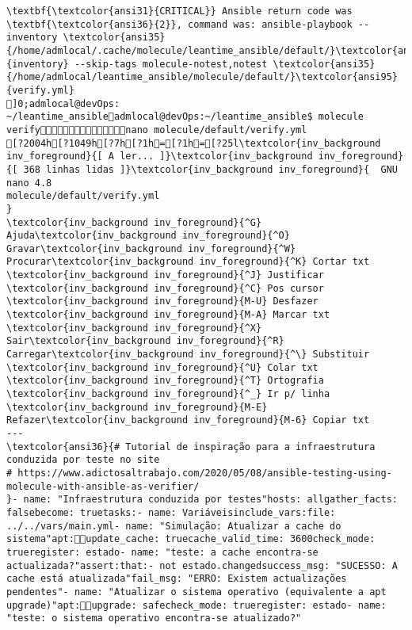 \documentclass{scrartcl}
\begin{document}
\begin{Verbatim}
\textbf{\textcolor{ansi31}{CRITICAL}} Ansible return code was \textbf{\textcolor{ansi36}{2}}, command was: ansible-playbook --inventory \textcolor{ansi35}{/home/admlocal/.cache/molecule/leantime_ansible/default/}\textcolor{ansi95}{inventory} --skip-tags molecule-notest,notest \textcolor{ansi35}{/home/admlocal/leantime_ansible/molecule/default/}\textcolor{ansi95}{verify.yml}
]0;admlocal@devOps: ~/leantime_ansibleadmlocal@devOps:~/leantime_ansible$ molecule verifynano molecule/default/verify.yml 
[?2004h[?1049h[?7h[?1h=[?1h=[?25l\textcolor{inv_background inv_foreground}{[ A ler... ]}\textcolor{inv_background inv_foreground}{[ 368 linhas lidas ]}\textcolor{inv_background inv_foreground}{  GNU nano 4.8                                          molecule/default/verify.yml                                                       }
\textcolor{inv_background inv_foreground}{^G} Ajuda\textcolor{inv_background inv_foreground}{^O} Gravar\textcolor{inv_background inv_foreground}{^W} Procurar\textcolor{inv_background inv_foreground}{^K} Cortar txt    \textcolor{inv_background inv_foreground}{^J} Justificar    \textcolor{inv_background inv_foreground}{^C} Pos cursor    \textcolor{inv_background inv_foreground}{M-U} Desfazer     \textcolor{inv_background inv_foreground}{M-A} Marcar txt
\textcolor{inv_background inv_foreground}{^X} Sair\textcolor{inv_background inv_foreground}{^R} Carregar\textcolor{inv_background inv_foreground}{^\} Substituir    \textcolor{inv_background inv_foreground}{^U} Colar txt     \textcolor{inv_background inv_foreground}{^T} Ortografia    \textcolor{inv_background inv_foreground}{^_} Ir p/ linha   \textcolor{inv_background inv_foreground}{M-E} Refazer\textcolor{inv_background inv_foreground}{M-6} Copiar txt
---
\textcolor{ansi36}{# Tutorial de inspiração para a infraestrutura conduzida por teste no site
# https://www.adictosaltrabajo.com/2020/05/08/ansible-testing-using-molecule-with-ansible-as-verifier/
}- name: "Infraestrutura conduzida por testes"hosts: allgather_facts: falsebecome: truetasks:- name: Variáveisinclude_vars:file: ../../vars/main.yml- name: "Simulação: Atualizar a cache do sistema"apt:update_cache: truecache_valid_time: 3600check_mode: trueregister: estado- name: "teste: a cache encontra-se actualizada?"assert:that:- not estado.changedsuccess_msg: "SUCESSO: A cache está atualizada"fail_msg: "ERRO: Existem actualizações pendentes"- name: "Atualizar o sistema operativo (equivalente a apt upgrade)"apt:upgrade: safecheck_mode: trueregister: estado- name: "teste: o sistema operativo encontra-se atualizado?"

\end{Verbatim}
\end{document}
